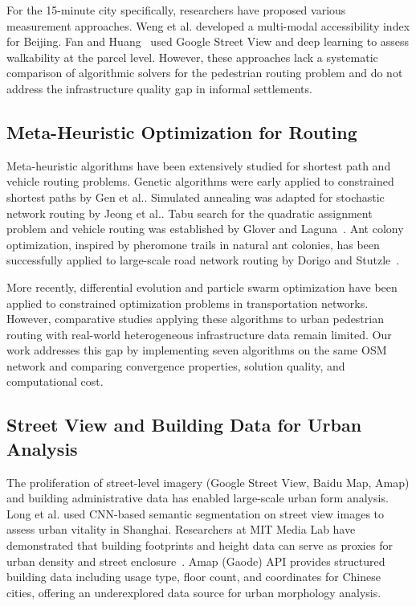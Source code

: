 \documentclass[journal]{IEEEtran}
\begin{document}
For the 15-minute city specifically, researchers have proposed various measurement approaches. Weng et al.\@\cite{weng2021accessibility} developed a multi-modal accessibility index for Beijing. Fan and Huang~\cite{fan2022walkability} used Google Street View and deep learning to assess walkability at the parcel level. However, these approaches lack a systematic comparison of algorithmic solvers for the pedestrian routing problem and do not address the infrastructure quality gap in informal settlements.

\subsection{Meta-Heuristic Optimization for Routing}
Meta-heuristic algorithms have been extensively studied for shortest path and vehicle routing problems. Genetic algorithms were early applied to constrained shortest paths by Gen et al.\@\cite{gen2008genetic}. Simulated annealing was adapted for stochastic network routing by Jeong et al.\@\cite{jeong2009simulated}. Tabu search for the quadratic assignment problem and vehicle routing was established by Glover and Laguna~\cite{glover1997tabu}. Ant colony optimization, inspired by pheromone trails in natural ant colonies, has been successfully applied to large-scale road network routing by Dorigo and Stutzle~\cite{dorigo2004ant}.

More recently, differential evolution and particle swarm optimization have been applied to constrained optimization problems in transportation networks. However, comparative studies applying these algorithms to urban pedestrian routing with real-world heterogeneous infrastructure data remain limited. Our work addresses this gap by implementing seven algorithms on the same OSM network and comparing convergence properties, solution quality, and computational cost.

\subsection{Street View and Building Data for Urban Analysis}
The proliferation of street-level imagery (Google Street View, Baidu Map, Amap) and building administrative data has enabled large-scale urban form analysis. Long et al.\@\cite{long2020deep} used CNN-based semantic segmentation on street view images to assess urban vitality in Shanghai. Researchers at MIT Media Lab have demonstrated that building footprints and height data can serve as proxies for urban density and street enclosure~\cite{zhang2021building}. Amap (Gaode) API provides structured building data including usage type, floor count, and coordinates for Chinese cities, offering an underexplored data source for urban morphology analysis.
\end{document}
